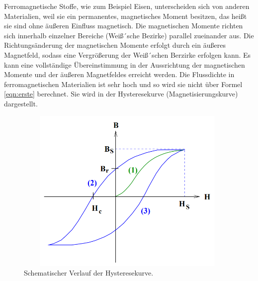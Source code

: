 Ferromagnetische Stoffe, wie zum Beispiel Eisen, unterscheiden sich von anderen Materialien,
weil sie ein permanentes, magnetisches Moment besitzen, das heißt sie sind ohne äußeren Einfluss magnetisch.
Die magnetischen Momente richten sich innerhalb einzelner Bereiche (Weiß´sche Bezirke) parallel zueinander aus.
Die Richtungsänderung der magnetischen Momente erfolgt durch ein äußeres Magnetfeld,
sodass eine Vergrößerung der Weiß´schen Berzirke erfolgen kann.
Es kann eine vollständige Übereinstimmung in der Aussrichtung der magnetischen Momente und der äußeren Magnetfeldes erreicht werden.
Die Flussdichte in ferromagnetischen Materialien ist sehr hoch und so wird sie nicht über Formel \ref{eqn:erste} berechnet.
Sie wird in der Hysteresekurve (Magnetisierungskurve) dargestellt.

\begin{figure}
  \centering
  \includegraphics[width=11cm, height=8cm]{content/bilder/Spule3.PNG}
  \caption{Schematischer Verlauf der Hysteresekurve.\cite{Anleitung}}
  \label{fig:Spule3}
\end{figure}

